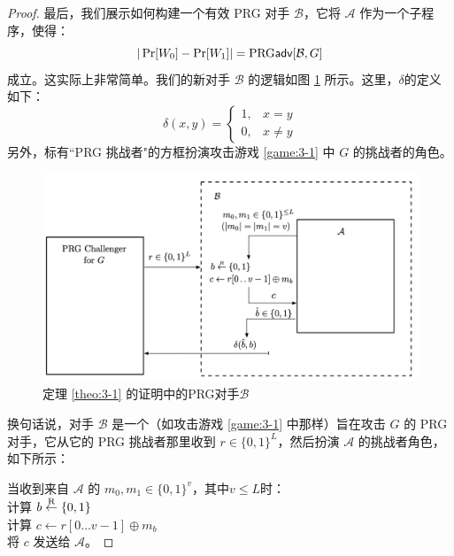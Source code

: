 \begin{proof}
最后，我们展示如何构建一个有效 PRG 对手 $\mathcal B$，它将 $\mathcal A$ 作为一个子程序，使得：
\begin{equation}\label{eq:3-6}
|\Pr[W_0]-\Pr[W_1]|={\rm PRG\mathsf{adv}}[\mathcal{B},G]
\end{equation}
成立。这实际上非常简单。我们的新对手 $\mathcal B$ 的逻辑如图 \ref{fig:3-4} 所示。这里，$\delta$的定义如下：
\begin{equation}\label{eq:3-7}
\delta(x,y)=
\left\{
\begin{array}{ll}
1, & x=y\\
0, & x\neq y
\end{array}
\right.
\end{equation}
另外，标有``PRG 挑战者"的方框扮演攻击游戏 \ref{game:3-1} 中 $G$ 的挑战者的角色。

\begin{figure}
  \centering
  \includegraphics[width=0.75\linewidth]{figures/chapter3/fig4.png}
  \caption{定理 \ref{theo:3-1} 的证明中的PRG对手$\mathcal{B}$}
  \label{fig:3-4}
\end{figure}

换句话说，对手 $\mathcal B$ 是一个（如攻击游戏 \ref{game:3-1} 中那样）旨在攻击 $G$ 的 PRG 对手，它从它的 PRG 挑战者那里收到 $r\in\{0,1\}^L$，然后扮演 $\mathcal A$ 的挑战者角色，如下所示：

\vspace*{5pt}

\hspace*{5pt} 当收到来自 $\mathcal A$ 的 $m_0,m_1\in\{0,1\}^v$，其中$v\leq L$时：\\
\hspace*{50pt} 计算 $b\overset{\rm R}\leftarrow\{0,1\}$\\
\hspace*{50pt} 计算 $c\leftarrow r[0\dots v-1]\oplus m_b$\\
\hspace*{50pt} 将 $c$ 发送给 $\mathcal A$。

\vspace*{5pt}


\end{proof}
